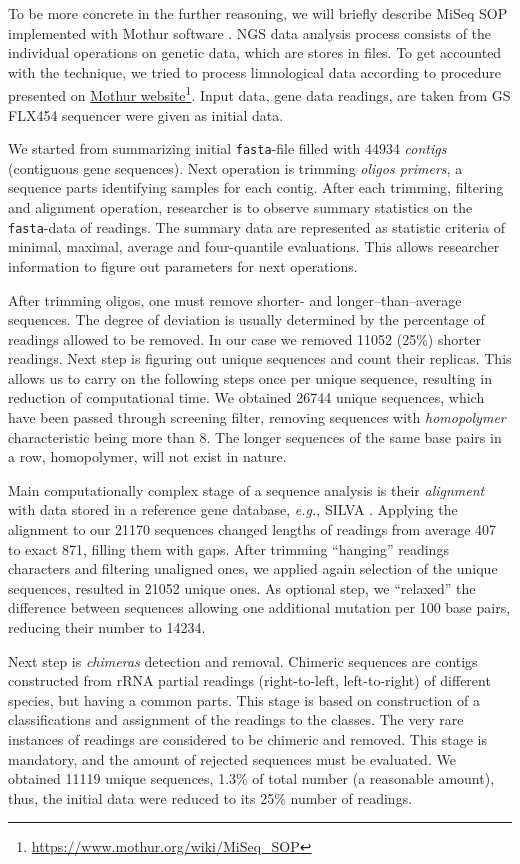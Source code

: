 \documentclass[a4paper]{jpconf}
\begin{document}
To be more concrete in the further reasoning, we will briefly describe MiSeq SOP implemented with Mothur software \cite{mothur}.  NGS data analysis process consists of the individual operations on genetic data, which are stores in files. To get accounted with the technique, we tried to process limnological data \cite{mik19} according to procedure presented on \href{https://www.mothur.org/wiki/MiSeq_SOP}{Mothur website}\footnote{\url{https://www.mothur.org/wiki/MiSeq_SOP}}. Input data, gene data readings, are taken from GS FLX454 sequencer were given as initial data.

We started from summarizing initial \verb|fasta|-file filled with 44934 \emph{contigs} (contiguous gene sequences). Next operation is trimming \emph{oligos primers}, a sequence parts identifying samples for each contig. After each trimming, filtering and alignment operation, researcher is to observe summary statistics on the \verb|fasta|-data of readings. The summary data are represented as statistic criteria of minimal, maximal, average and four-quantile evaluations. This allows researcher information to figure out parameters for next operations.

After trimming oligos, one must remove shorter- and longer--than--average sequences. The degree of deviation is usually determined by the percentage of readings allowed to be removed. In our case we removed 11052 (25\%) shorter readings. Next step is figuring out unique sequences and count their replicas. This allows us to carry on the following steps once per unique sequence, resulting in reduction of computational time. We obtained 26744 unique sequences, which have been passed through screening filter, removing sequences with \emph{homopolymer} characteristic being more than 8. The longer sequences of the same base pairs in a row, homopolymer, will not exist in nature.

Main computationally complex stage of a sequence analysis is their \emph{alignment} with data stored in a reference gene database, \emph{e.g.}, SILVA \cite{silva}. Applying the alignment to our 21170 sequences changed lengths of readings from average 407 to exact 871, filling them with gaps. After trimming ``hanging'' readings characters and filtering unaligned ones, we applied again selection of the unique sequences, resulted in 21052 unique ones. As optional step, we ``relaxed'' the difference between sequences allowing one additional mutation per 100 base pairs, reducing their number to 14234.

Next step is \emph{chimeras} detection and removal. Chimeric sequences are contigs constructed from rRNA partial readings (right-to-left, left-to-right) of different species, but having a common parts. This stage is based on construction of a classifications and assignment of the readings to the classes.  The very rare instances of readings are considered to be chimeric and removed. This stage is mandatory, and the amount of rejected sequences must be evaluated. We obtained 11119 unique sequences, 1.3\% of total number (a reasonable amount), thus, the initial data were reduced to its 25\% number of readings.
\end{document}
